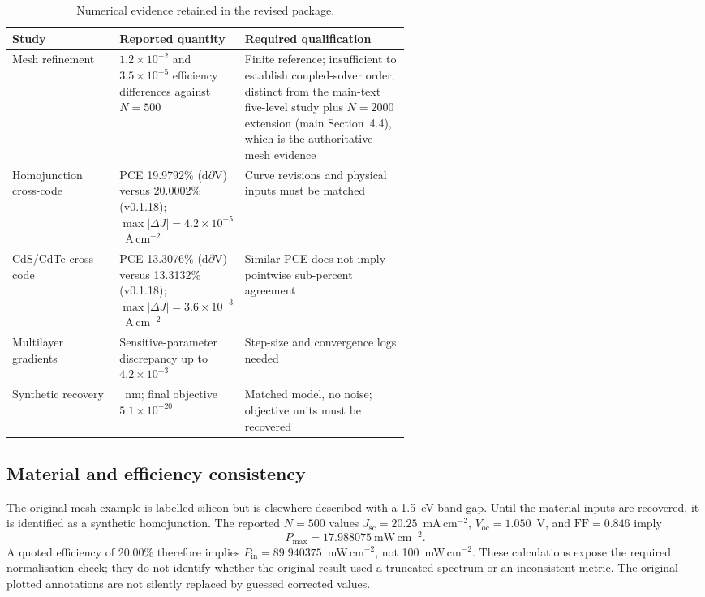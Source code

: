 \documentclass[11pt,a4paper]{article}
\numberwithin{equation}{section}
\begin{document}
\begin{table}[tbp]
\centering\small
\caption{Numerical evidence retained in the revised package.}
\begin{tabularx}{\linewidth}{@{}>{\raggedright\arraybackslash}p{0.27\linewidth}>{\raggedright\arraybackslash}p{0.30\linewidth}>{\raggedright\arraybackslash}X@{}}
\toprule
Study & Reported quantity & Required qualification \\
\midrule
Mesh refinement & $1.2\times10^{-2}$ and $3.5\times10^{-5}$ efficiency
differences against $N=500$ & Finite reference; insufficient to establish
coupled-solver order; distinct from the main-text five-level study plus
$N=2000$ extension (main Section~4.4), which is the authoritative mesh
evidence \\
Homojunction cross-code & PCE 19.9792\% (d$\partial$V) versus 20.0002\% (v0.1.18);
$\max|\Delta J|=4.2\times10^{-5}$~A\,cm$^{-2}$ & Curve revisions and
physical inputs must be matched \\
CdS/CdTe cross-code & PCE 13.3076\% (d$\partial$V) versus 13.3132\% (v0.1.18);
$\max|\Delta J|=3.6\times10^{-3}$~A\,cm$^{-2}$ & Similar PCE does not
imply pointwise sub-percent agreement \\
Multilayer gradients & Sensitive-parameter discrepancy up to
$4.2\times10^{-3}$ & Step-size and convergence logs needed \\
Synthetic recovery & 1800~nm; final objective $5.1\times10^{-20}$ &
Matched model, no noise; objective units must be recovered \\
\bottomrule
\end{tabularx}
\end{table}

\subsection{Material and efficiency consistency}
The original mesh example is labelled silicon but is elsewhere described
with a 1.5~eV band gap. Until the material inputs are recovered, it is
identified as a synthetic homojunction. The reported $N=500$ values
$J_{\mathrm{sc}}=20.25$~mA\,cm$^{-2}$, $V_{\mathrm{oc}}=1.050$~V,
and $\mathrm{FF}=0.846$ imply
\begin{equation}
P_{\max}=17.988075~\mathrm{mW\,cm^{-2}}.
\end{equation}
A quoted efficiency of 20.00\% therefore implies
$P_{\mathrm{in}}=89.940375$~mW\,cm$^{-2}$, not
100~mW\,cm$^{-2}$. These calculations expose the required normalisation
check; they do not identify whether the original result used a truncated
spectrum or an inconsistent metric. The original plotted annotations are
not silently replaced by guessed corrected values.
\end{document}
